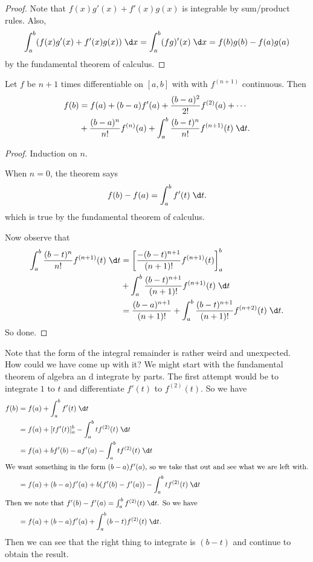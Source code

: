 \documentclass[a4paper]{article}
\begin{document}
\begin{proof}
  Note that $f(x)g'(x) + f'(x)g(x)$ is integrable by sum/product rules. Also,
  \[
    \int_a^b (f(x)g'(x) + f'(x)g(x))\;\d x = \int_a^b(fg)'(x)\;\d x = f(b)g(b) - f(a)g(a)
  \]
  by the fundamental theorem of calculus.
\end{proof}

\begin{thm}
  Let $f$ be $n + 1$ times differentiable on $[a, b]$ with with $f^{(n + 1)}$ continuous. Then
  \begin{align*}
    f(b) &= f(a) + (b - a)f'(a) + \frac{(b - a)^2}{2!}f^{(2)}(a) + \cdots \\
    &+ \frac{(b - a)^n}{n!}f^{(n)}(a) + \int_a^b \frac{(b - t)^n}{n!}f^{(n + 1)}(t)\;\d t.
  \end{align*}
\end{thm}
\begin{proof}
  Induction on $n$.

  When $n = 0$, the theorem says
  \[
    f(b) - f(a) = \int_a^b f'(t)\;\d t.
  \]
  which is true by the fundamental theorem of calculus.

  Now observe that
  \begin{align*}
    \int_a^b \frac{(b - t)^n}{n!}f^{(n + 1)}(t)\;\d t &= \left[\frac{-(b - t)^{n + 1}}{(n + 1)!}f^{(n + 1)}(t)\right]_a^b\\
    &+ \int_a^b \frac{(b - t)^{n + 1}}{(n + 1)!}f^{(n + 1)}(t)\;\d t \\
    &= \frac{(b - a)^{n + 1}}{(n + 1)!} + \int_a^b \frac{(b - t)^{n + 1}}{(n + 1)!}f^{(n + 2)}(t)\;\d t.
  \end{align*}
  So done.
\end{proof}
Note that the form of the integral remainder is rather weird and unexpected. How could we have come up with it? We might start with the fundamental theorem of algebra an d integrate by parts. The first attempt would be to integrate $1$ to $t$ and differentiate $f'(t)$ to $f^{(2)}(t)$. So we have
\begin{align*}
  f(b) &= f(a) + \int_a^b f'(t)\;\d t\\
  &= f(a) + [tf'(t)]_a^b - \int_a^b tf^{(2)}(t)\;\d t\\
  &= f(a) + bf'(b) - af'(a) - \int_a^b tf^{(2)}(t)\;\d t\\
  \intertext{We want something in the form $(b - a)f'(a)$, so we take that out and see what we are left with.}
  &= f(a) + (b - a)f'(a) + b(f'(b) - f'(a)) - \int_a^b tf^{(2)}(t)\;\d t\\
  \intertext{Then we note that $f'(b) - f'(a) = \int_a^b f^{(2)}(t)\;\d t$. So we have}
  &= f(a) + (b - a)f'(a) + \int_a^b (b - t)f^{(2)}(t)\;\d t.
\end{align*}
Then we can see that the right thing to integrate is $(b - t)$ and continue to obtain the result.
\end{document}
